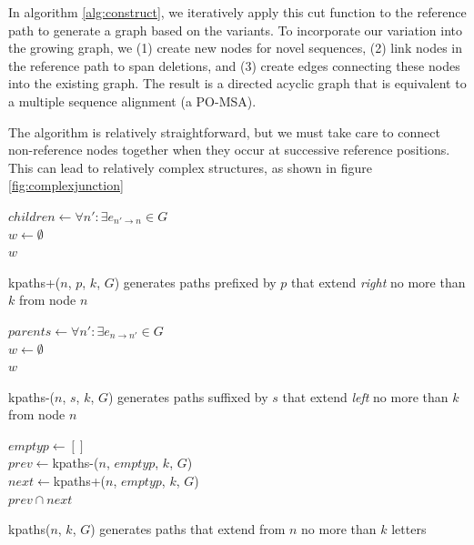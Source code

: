 \documentclass{article}
\begin{document}
In algorithm \ref{alg:construct}, we iteratively apply this cut function to the reference path to generate a graph based on the variants. To incorporate our variation into the growing graph, we (1) create new nodes for novel sequences, (2) link nodes in the reference path to span deletions, and (3) create edges connecting these nodes into the existing graph. The result is a directed acyclic graph that is equivalent to a multiple sequence alignment (a PO-MSA).

The algorithm is relatively straightforward, but we must take care to connect non-reference nodes together when they occur at successive reference positions. This can lead to relatively complex structures, as shown in figure \ref{fig:complexjunction}


\begin{function}[h!]
  \label{func:kpaths+}
  $children \gets \forall n' : \exists e_{n' \rightarrow n} \in G$ \\
  $w \gets \emptyset$ \\
  \Return $w$
  \caption{kpaths+($n$, $p$, $k$, $G$) generates paths prefixed by $p$ that extend \emph{right} no more than $k$ from node $n$ }
\end{function}

\begin{function}[h!]
  \label{func:kpaths-}
  $parents \gets \forall n' : \exists e_{n \rightarrow n'} \in G$ \\
  $w \gets \emptyset$ \\
  \Return $w$
  \caption{kpaths-($n$, $s$, $k$, $G$) generates paths suffixed by $s$ that extend \emph{left} no more than $k$ from node $n$ }
\end{function}

\begin{function}[h!]
  \label{func:kpaths}
  $emptyp \gets []$ \\
  $prev \gets $kpaths-($n$, $emptyp$, $k$, $G$) \\
  $next \gets $kpaths+($n$, $emptyp$, $k$, $G$) \\
  \Return $prev \cap next$ 
  \caption{kpaths($n$, $k$, $G$) generates paths that extend from $n$ no more than $k$ letters }
\end{function}
\end{document}
